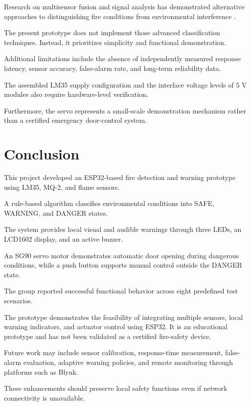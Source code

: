\documentclass[12pt,a4paper]{article}
\begin{document}
Research on multisensor fusion and
signal analysis has demonstrated
alternative approaches to distinguishing
fire conditions from environmental
interference
\cite{yu2023multidetector,
solorzano2022gas,nakip2021rtpnn}.

The present prototype does not
implement those advanced classification
techniques. Instead, it prioritizes
simplicity and functional demonstration.

Additional limitations include
the absence of independently measured
response latency, sensor accuracy,
false-alarm rate, and long-term
reliability data.

The assembled LM35 supply configuration
and the interface voltage levels of
5 V modules also require hardware-level
verification.

Furthermore, the servo represents
a small-scale demonstration mechanism
rather than a certified emergency
door-control system.

\section{Conclusion}

This project developed an ESP32-based
fire detection and warning prototype
using LM35, MQ-2, and flame sensors.

A rule-based algorithm classifies
environmental conditions into
SAFE, WARNING, and DANGER states.

The system provides local visual
and audible warnings through three
LEDs, an LCD1602 display, and
an active buzzer.

An SG90 servo motor demonstrates
automatic door opening during
dangerous conditions, while
a push button supports manual
control outside the DANGER state.

The group reported successful
functional behavior across eight
predefined test scenarios.

The prototype demonstrates the
feasibility of integrating multiple
sensors, local warning indicators,
and actuator control using ESP32.
It is an educational prototype
and has not been validated as a
certified fire-safety device.

Future work may include sensor
calibration, response-time measurement,
false-alarm evaluation, adaptive
warning policies, and remote
monitoring through platforms such
as Blynk.

These enhancements should preserve
local safety functions even if
network connectivity is unavailable.
\end{document}
